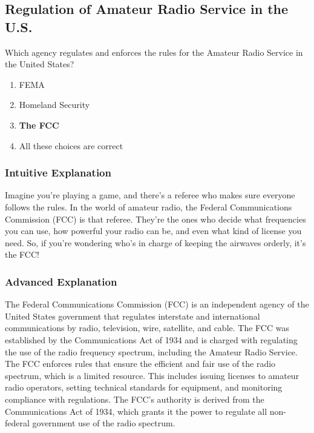 \subsection{Regulation of Amateur Radio Service in the U.S.}
\label{T1A02}

\begin{tcolorbox}[colback=gray!10!white,colframe=black!75!black,title=T1A02]
Which agency regulates and enforces the rules for the Amateur Radio Service in the United States?
\begin{enumerate}[label=\Alph*)]
    \item FEMA
    \item Homeland Security
    \item \textbf{The FCC}
    \item All these choices are correct
\end{enumerate}
\end{tcolorbox}

\subsubsection{Intuitive Explanation}
Imagine you’re playing a game, and there’s a referee who makes sure everyone follows the rules. In the world of amateur radio, the Federal Communications Commission (FCC) is that referee. They’re the ones who decide what frequencies you can use, how powerful your radio can be, and even what kind of license you need. So, if you’re wondering who’s in charge of keeping the airwaves orderly, it’s the FCC!

\subsubsection{Advanced Explanation}
The Federal Communications Commission (FCC) is an independent agency of the United States government that regulates interstate and international communications by radio, television, wire, satellite, and cable. The FCC was established by the Communications Act of 1934 and is charged with regulating the use of the radio frequency spectrum, including the Amateur Radio Service. The FCC enforces rules that ensure the efficient and fair use of the radio spectrum, which is a limited resource. This includes issuing licenses to amateur radio operators, setting technical standards for equipment, and monitoring compliance with regulations. The FCC’s authority is derived from the Communications Act of 1934, which grants it the power to regulate all non-federal government use of the radio spectrum.

